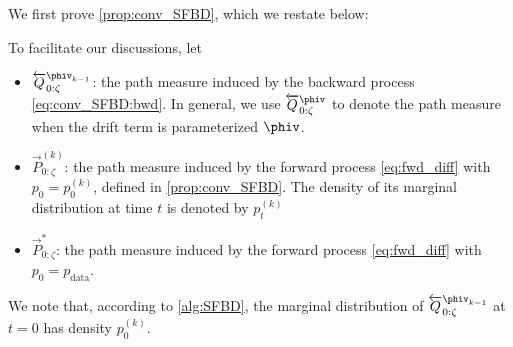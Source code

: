 \def\bwdM{\overleftarrow{Q}_{0:\zeta}}
\def\fwdM{\overrightarrow{P}_{0:\zeta}}
\def\argmin{\textrm{argmin}}

We first prove \cref{prop:conv_SFBD}, which we restate below:
\convSFBD*

To facilitate our discussions, let
\begin{itemize}
	\item $\bwdM^{\phiv_{k-1}}$: the path measure induced by the backward process \cref{eq:conv_SFBD:bwd}. In general, we use $\bwdM^{\phiv}$ to denote the path measure when the drift term is parameterized $\phiv$. 
	\item $\fwdM^{(k)}$: the path measure induced by the forward process \cref{eq:fwd_diff} with $p_0 = p_0^{(k)}$, defined in \cref{prop:conv_SFBD}. The density of its marginal distribution at time $t$ is denoted by $p_t^{(k)}$
	\item $\fwdM^*$: the path measure induced by the forward process \cref{eq:fwd_diff} with $p_0 = p_\text{data}$. 
\end{itemize}
We note that, according to \cref{alg:SFBD}, the marginal distribution of $\bwdM^{\phiv_{k-1}}$ at $t = 0$ has density $p_0^{(k)}$. 


